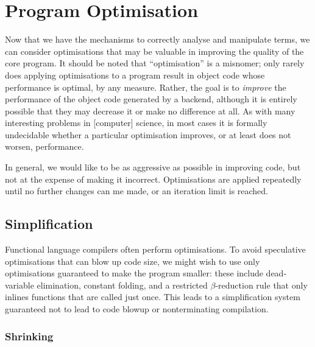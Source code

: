 


\section{Program Optimisation}

Now that we have the mechanisms to correctly analyse and manipulate terms, we
can consider optimisations that may be valuable in improving the quality of the
core program. It should be noted that ``optimisation'' is a misnomer; only
rarely does applying optimisations to a program result in object code whose
performance is optimal, by any measure. Rather, the goal is to \emph{improve}
the performance of the object code generated by a backend, although it is
entirely possible that they may decrease it or make no difference at all. As
with many interesting problems in [computer] science, in most cases it is
formally undecidable whether a particular optimisation improves, or at least
does not worsen, performance.

In general, we would like to be as aggressive as possible in improving code, but
not at the expense of making it incorrect. Optimisations are applied repeatedly
until no further changes can me made, or an iteration limit is reached.


\subsection{Simplification}

Functional language compilers often perform optimisations. To avoid speculative
optimisations that can blow up code size, we might wish to use only
optimisations guaranteed to make the program smaller: these include
dead-variable elimination, constant folding, and a restricted $\beta$-reduction
rule that only inlines functions that are called just once. This leads to a
simplification system guaranteed not to lead to code blowup or nonterminating
compilation.


\subsubsection{Shrinking}

